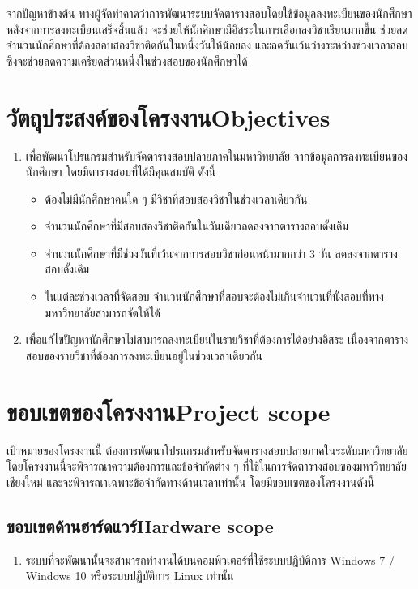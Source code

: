 จากปัญหาข้างต้น ทางผู้จัดทำคาดว่าการพัฒนาระบบจัดตารางสอบโดยใช้ข้อมูลลงทะเบียนของนักศึกษา 
หลังจากการลงทะเบียนเสร็จสิ้นแล้ว จะช่วยให้นักศึกษามีอิสระในการเลือกลงวิชาเรียนมากขึ้น 
ช่วยลดจำนวนนักศึกษาที่ต้องสอบสองวิชาติดกันในหนึ่งวันให้น้อยลง และลดวันเว้นว่างระหว่างช่วงเวลาสอบ 
ซึ่งจะช่วยลดความเครียดส่วนหนึ่งในช่วงสอบของนักศึกษาได้

\newpage
\section{\ifcpe วัตถุประสงค์ของโครงงาน\else Objectives\fi}
\label{sec:Objectives}
\begin{enumerate}
    \item เพื่อพัฒนาโปรแกรมสำหรับจัดตารางสอบปลายภาคในมหาวิทยาลัย จากข้อมูลการลงทะเบียนของนักศึกษา โดยมีตารางสอบที่ได้มีคุณสมบัติ ดังนี้
    \begin{itemize}
        \item ต้องไม่มีนักศึกษาคนใด ๆ มีวิชาที่สอบสองวิชาในช่วงเวลาเดียวกัน
        \item จำนวนนักศึกษาที่มีสอบสองวิชาติดกันในวันเดียวลดลงจากตารางสอบดั้งเดิม
        \item จำนวนนักศึกษาที่มีช่วงวันที่เว้นจากการสอบวิชาก่อนหน้ามากกว่า 3 วัน ลดลงจากตารางสอบดั้งเดิม
        \item ในแต่ละช่วงเวลาที่จัดสอบ จำนวนนักศึกษาที่สอบจะต้องไม่เกินจำนวนที่นั่งสอบที่ทางมหาวิทยาลัยสามารถจัดให้ได้
    \end{itemize}
    \item เพื่อแก้ไขปัญหานักศึกษาไม่สามารถลงทะเบียนในรายวิชาที่ต้องการได้อย่างอิสระ เนื่องจากตารางสอบของรายวิชาที่ต้องการลงทะเบียนอยู่ในช่วงเวลาเดียวกัน
\end{enumerate}

\section{\ifcpe ขอบเขตของโครงงาน\else Project scope\fi}
เป้าหมายของโครงงานนี้ ต้องการพัฒนาโปรแกรมสำหรับจัดตารางสอบปลายภาคในระดับมหาวิทยาลัย
โดยโครงงานนี้จะพิจารณาความต้องการและข้อจำกัดต่าง ๆ ที่ใช้ในการจัดตารางสอบของมหาวิทยาลัยเชียงใหม่
และจะพิจารณาเฉพาะข้อจำกัดทางด้านเวลาเท่านั้น โดยมีขอบเขตของโครงงานดังนี้ 
\subsection{\ifcpe ขอบเขตด้านฮาร์ดแวร์\else Hardware scope\fi}
\begin{enumerate}
    \item ระบบที่จะพัฒนานั้นจะสามารถทำงานได้บนคอมพิวเตอร์ที่ใช้ระบบปฏิบัติการ Windows 7 / Windows 10 หรือระบบปฏิบัติการ Linux เท่านั้น
\end{enumerate}
